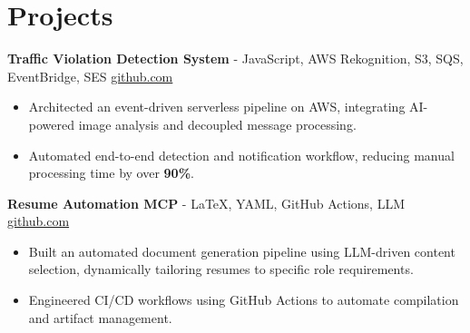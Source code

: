 \documentclass[11pt]{article}
\begin{document}
\vspace{-18.5pt}

\section*{Projects}

\textbf{Traffic Violation Detection System}{ - JavaScript, AWS Rekognition, S3, SQS, EventBridge, SES} \hfill \href{https://github.com/Monica20030707/AWS_rekonigition-N-read-database}{github.com} \\
\vspace{-9pt}
\begin{itemize}
  \item Architected an event-driven serverless pipeline on AWS, integrating AI-powered image analysis and decoupled message processing.
  \item Automated end-to-end detection and notification workflow, reducing manual processing time by over \textbf{90\%}.
\end{itemize}

\textbf{Resume Automation MCP}{ - LaTeX, YAML, GitHub Actions, LLM} \hfill \href{https://github.com/Monica20030707/Tex_OrangeLeaf-mcp}{github.com} \\
\vspace{-9pt}
\begin{itemize}
  \item Built an automated document generation pipeline using LLM-driven content selection, dynamically tailoring resumes to specific role requirements.
  \item Engineered CI/CD workflows using GitHub Actions to automate compilation and artifact management.
\end{itemize}

\end{document}
